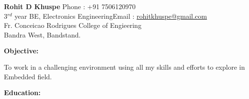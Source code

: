 \documentclass[a4paper]{res}
\begin{document}
	\begin{flushleft}
		\large\textbf{Rohit D Khuspe} \hfill{Phone : +91 7506120970}\\
		3$^{rd}$ year BE, Electronics Engineering\hfill{Email : \underline{rohitkhuspe@gmail.com}}\\
		Fr. Conceicao Rodrigues College of Engieering\\
		Bandra West, Bandstand.\\
		
			
	\end{flushleft}
	
 \begin{flushleft}
 	\begin{Large}\textbf{Objective:}\end{Large} \hspace{0.05in}\large To work in a challenging environment using all my skills and efforts to explore in Embedded field.\\
 	\begin{Large}\vspace{0.5in}\textbf{Education:}\end{Large}
 	
 \end{flushleft}

	

	
\end{document}
